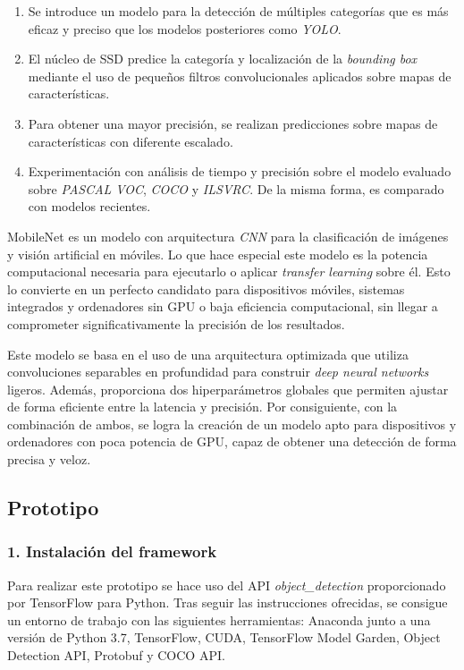 \begin{enumerate}
	\item Se introduce un modelo para la detección de múltiples categorías que es más eficaz y preciso que los modelos posteriores como \textit{YOLO}.
	\item El núcleo de SSD predice la categoría y localización de la \textit{bounding box} mediante el uso de pequeños filtros convolucionales aplicados sobre mapas de características.
	\item Para obtener una mayor precisión, se realizan predicciones sobre mapas de características con diferente escalado.
	\item Experimentación con análisis de tiempo y precisión sobre el modelo evaluado sobre \textit{PASCAL VOC}, \textit{COCO} y \textit{ILSVRC}. De la misma forma, es comparado con modelos recientes.
\end{enumerate}

MobileNet es un modelo con arquitectura \textit{CNN} para la clasificación de imágenes y visión artificial en móviles. Lo que hace especial este modelo es la potencia computacional necesaria para ejecutarlo o aplicar \textit{transfer learning} sobre él. Esto lo convierte en un perfecto candidato para dispositivos móviles, sistemas integrados y ordenadores sin GPU o baja eficiencia computacional, sin llegar a comprometer significativamente la precisión de los resultados.

Este modelo se basa en el uso de una arquitectura optimizada que utiliza convoluciones separables en profundidad para construir \textit{deep neural networks} ligeros. Además, proporciona dos hiperparámetros globales que permiten ajustar de forma eficiente entre la latencia y precisión. Por consiguiente, con la combinación de ambos, se logra la creación de un modelo apto para dispositivos y ordenadores con poca potencia de GPU, capaz de obtener una detección de forma precisa y veloz.

\newpage
\subsection*{Prototipo}

\vspace{-0.5cm}
\subsubsection*{1. Instalación del framework}
\vspace{-0.7cm}
Para realizar este prototipo se hace uso del API \textit{object\_detection} proporcionado por TensorFlow para Python. Tras seguir las instrucciones ofrecidas, se consigue un entorno de trabajo con las siguientes herramientas: Anaconda junto a una versión de Python 3.7, TensorFlow, CUDA, TensorFlow Model Garden,  Object Detection API, Protobuf y COCO API.

